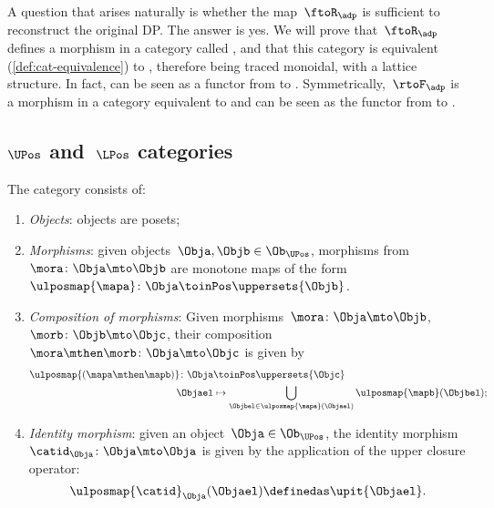 A question that arises naturally is whether the map~$\ftoR_\adp$ is sufficient to reconstruct the original DP.
The answer is yes.
We will prove that~$\ftoR_\adp$ defines a morphism in a category called \UPos, and that this category is equivalent (\cref{def:cat-equivalence}) to \DP, therefore being traced monoidal, with a lattice structure.
In fact, \FixFunMinRes can be seen as a functor from \DP to \UPos.
Symmetrically,~$\rtoF_\adp$ is a morphism in a category \LPos equivalent to \DP and \FixResMaxFun can be seen as the functor from \DP to \LPos.

\subsection{$\UPos$ and~$\LPos$ categories}

\begin{definition}
	\label{def:upos_cat}
	The category \UPos consists of:
	\begin{enumerate}
		\item \emph{Objects}: objects are posets;
		\item \emph{Morphisms}: given objects~$\Obja,\Objb\in \Ob_{\UPos}$, morphisms from~$\mora\colon \Obja \mto \Objb$ are monotone maps of the form~$\ulposmap{\mapa} \colon \Obja \toinPos \uppersets{\Objb}$.
		\item \emph{Composition of morphisms}: Given morphisms~$\mora\colon \Obja \mto \Objb$,~$\morb\colon \Objb\mto \Objc$, their composition~$\mora\mthen \morb\colon \Obja\mto \Objc$ is given by
		      \begin{equation}
			      \begin{aligned}
				      \ulposmap{(\mapa \mthen \mapb)} \colon \Obja & \toinPos \uppersets{\Objc}                                                       \\
				      \Objael                                      & \mapsto \bigcup_{\Objbel\in \ulposmap{\mapa}(\Objael)}\ulposmap{\mapb}(\Objbel);
			      \end{aligned}
		      \end{equation}
		\item \emph{Identity morphism}: given an object~$\Obja\in \Ob_{\UPos}$, the identity morphism $\catid_\Obja \colon \Obja \mto \Obja$ is given by the application of the upper closure operator:
		      \begin{equation}
			      \ulposmap{\catid}_\Obja(\Objael)\definedas \upit\{\Objael\}.
		      \end{equation}
	\end{enumerate}
\end{definition}

